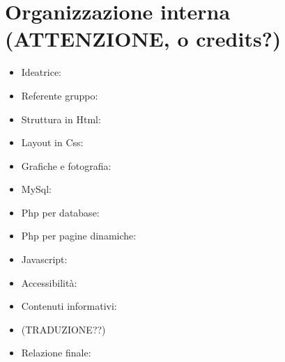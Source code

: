 \section{Organizzazione interna (ATTENZIONE, o credits?)}
\begin{itemize}
\item Ideatrice: 
\item Referente gruppo: 
\item Struttura in Html: 
\item Layout in Css:
\item Grafiche e fotografia:
\item MySql:
\item Php per database:
\item Php per pagine dinamiche:
\item Javascript: 
\item Accessibilità:
\item Contenuti informativi:
\item (TRADUZIONE??)
\item Relazione finale: 
\end{itemize}
